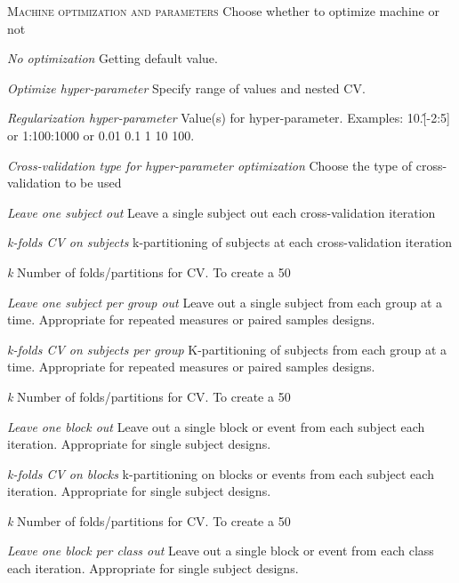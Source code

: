\textsc{Machine optimization and parameters}
Choose whether to optimize machine or not


\textsl{No optimization}
Getting default value.


\textsl{Optimize hyper-parameter}
Specify range of values and nested CV.


\textit{Regularization hyper-parameter}
Value(s) for hyper-parameter. Examples: 10.\^[-2:5] or 1:100:1000 or 0.01 0.1 1 10 100.


\textit{Cross-validation type for hyper-parameter optimization}
Choose the type of cross-validation to be used


\textit{Leave one subject out}
Leave a single subject out each cross-validation iteration


\textit{k-folds CV on subjects}
k-partitioning of subjects at each cross-validation iteration


\textit{k}
Number of folds/partitions for CV. To create a 50%


\textit{Leave one subject per group out}
Leave out a single subject from each group at a time. Appropriate for repeated measures or paired samples designs.


\textit{k-folds CV on subjects per group}
K-partitioning of subjects from each group at a time. Appropriate for repeated measures or paired samples designs.


\textit{k}
Number of folds/partitions for CV. To create a 50%


\textit{Leave one block out}
Leave out a single block or event from each subject each iteration. Appropriate for single subject designs.


\textit{k-folds CV on blocks}
k-partitioning on blocks or events from each subject each iteration. Appropriate for single subject designs.


\textit{k}
Number of folds/partitions for CV. To create a 50%


\textit{Leave one block per class out}
Leave out a single block or event from each class each iteration. Appropriate for single subject designs.


